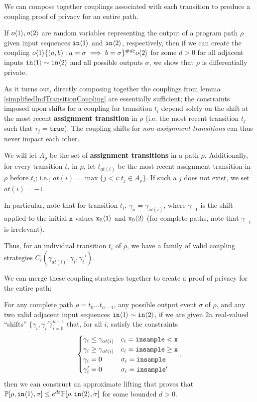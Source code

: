 We can compose together couplings associated with each transition to produce a coupling proof of privacy for an entire path. 

If $o\brangle{1}, o\brangle{2}$ are random variables representing the output of a program path $\rho$ given input sequences $\texttt{in}\brangle{1}$ and $\texttt{in}\brangle{2}$, respectively, 
then if we can create the coupling $o\brangle{1}\{(a, b): a=\sigma\implies b=\sigma\}^{\#d\varepsilon}o\brangle{2}$ for some $d>0$ for all adjacent inputs $\texttt{in}\brangle{1}\sim\texttt{in}\brangle{2}$ and all possible outputs $\sigma$, we show that $\rho$ is differentially private.

As it turns out, directly composing together the couplings from lemma \ref{simplifiedIndTransitionCoupling} are essentially sufficient; the constraints imposed upon shifts for a coupling for transition $t_i$ depend solely on the shift at the most recent \textbf{assignment transition} in $\rho$ (i.e. the most recent transition $t_j$ such that $\tau_j = \texttt{true}$). 
The coupling shifts for \textit{non-assignment transitions} can thus never impact each other. 

We will let $A_\rho$ be the set of \textbf{assignment transitions} in a path $\rho$. Additionally, for every transition $t_i$ in $\rho$, let $t_{at(i)}$ be the most recent assignment transition in $\rho$ before $t_i$; i.e., $at(i) = \max\{j<i: t_j\in A_\rho\}$. If such a $j$ does not exist, we set $at(i)=-1$. 

In particular, note that for transition $t_i$, $\gamma_x = \gamma_{at(i)}$, where $\gamma_{-1}$ is the shift applied to the initial $\texttt{x}$-values $\texttt{x}_0\brangle{1}$ and $\texttt{x}_0\brangle{2}$ (for complete paths, note that $\gamma_{-1}$ is irrelevant).

Thus, for an individual transition $t_i$ of $\rho$, we have a family of valid coupling strategies $C_i(\gamma_{at(i)}, \gamma_i, \gamma_i')$. 

We can merge these coupling strategies together to create a proof of privacy for the entire path: 

\begin{lemma}\label{simplifiedMultTransitionsCouplingProof}
  For any complete path $\rho = t_0\ldots t_{n-1}$, any possible output event $\sigma$ of $\rho$, and any two valid adjacent input sequences $\texttt{in}\brangle{1}\sim \texttt{in}\brangle{2}$, if we are given $2n$ real-valued ``shifts'' $\{\gamma_i, \gamma_i'\}_{i=0}^{n-1}$ that, for all $i$, satisfy the constraints \[
        \begin{cases}
          \gamma_i\leq\gamma_{at(i)} & c_i = \lguard[\texttt{x}]\\
          \gamma_i\geq\gamma_{at(i)} & c_i = \gguard[\texttt{x}]\\
          \gamma_i=0 & \sigma_i = \texttt{insample}\\
          \gamma_i'=0 & \sigma_i = \texttt{insample}'
        \end{cases},
      \]
      then we can construct an approximate lifting that proves that $\PP[\rho, \texttt{in}\brangle{1}, \sigma] \leq e^{d\varepsilon}\PP[\rho, \texttt{in}\brangle{2}, \sigma]$ for some bounded $d>0$. 
\end{lemma}

